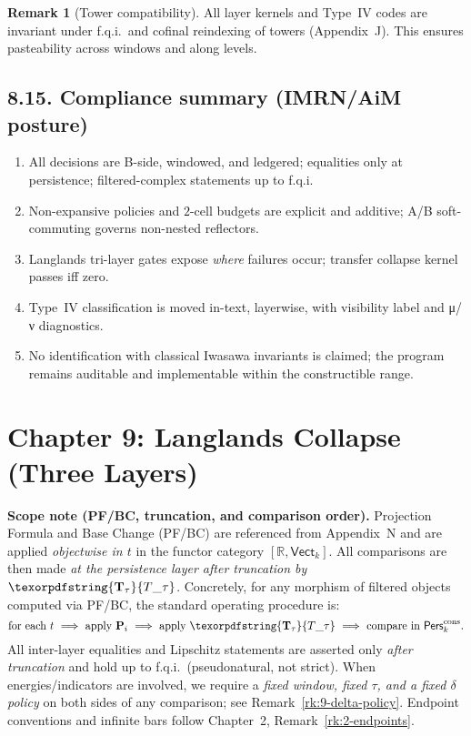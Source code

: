 \documentclass[11pt]{article}
\numberwithin{equation}{section}
\theoremstyle{plain}
\theoremstyle{definition}
\theoremstyle{remark}
\DeclareRobustCommand{\hyp}{\nobreakdash-}
\newcommand{\Pers}{\mathsf{Pers}}
\theoremstyle{plain}
\theoremstyle{definition}
\numberwithin{equation}{section}
\theoremstyle{definition}
\newtheorem{remark}[theorem]{Remark}
\DeclareRobustCommand{\Perskft}{\Pers^{\mathrm{cons}}_{k}}
\DeclareRobustCommand{\Ttau}{\texorpdfstring{\ensuremath{\mathbf{T}_{\tau}}}{T\_\tau}}
\numberwithin{equation}{section}
\theoremstyle{plain}
\theoremstyle{definition}
\theoremstyle{remark}
\providecommand{\Tfun}[1]{\mathbf{T}_{#1}}
\providecommand{\Ttau}{\Tfun{\tau}}
\begin{document}
\begin{remark}[Tower compatibility]
All layer kernels and Type~IV codes are invariant under f.q.i.\ and cofinal reindexing of towers (Appendix~J). This ensures pasteability across windows and along levels.
\end{remark}

\subsection*{8.15. Compliance summary (IMRN/AiM posture)}
\begin{enumerate}
  \item All decisions are B\hyp side, windowed, and ledgered; equalities only at persistence; filtered\hyp complex statements up to f.q.i.
  \item Non\hyp expansive policies and $2$\hyp cell budgets are explicit and additive; A/B soft\hyp commuting governs non\hyp nested reflectors.
  \item Langlands tri\hyp layer gates expose \emph{where} failures occur; transfer collapse kernel passes iff zero.
  \item Type~IV classification is moved in\hyp text, layerwise, with visibility label and μ/ν diagnostics.
  \item No identification with classical Iwasawa invariants is claimed; the program remains auditable and implementable within the constructible range.
\end{enumerate}



\section{Chapter 9: Langlands Collapse (Three Layers)}

\noindent\textbf{Scope note (PF/BC, truncation, and comparison order).}
Projection Formula and Base Change (PF/BC) are referenced from Appendix~N and are applied \emph{objectwise in \(t\)} in the functor category \([\mathbb{R},\mathsf{Vect}_k]\).
All comparisons are then made \emph{at the persistence layer after truncation by \(\Ttau\)}.
Concretely, for any morphism of filtered objects computed via PF/BC, the standard operating procedure is:
\[
\text{for each } t \ \Longrightarrow\ \text{apply } \mathbf{P}_i \ \Longrightarrow\ \text{apply } \Ttau \ \Longrightarrow\ \text{compare in } \Perskft.
\]
All inter\hyp layer equalities and Lipschitz statements are asserted only \emph{after truncation} and hold up to f.q.i.\ (pseudonatural, not strict).
When energies/indicators are involved, we require a \emph{fixed window, fixed \(\tau\), and a fixed \(\delta\)\nobreakdash policy} on both sides of any comparison; see Remark~\ref{rk:9-delta-policy}.
Endpoint conventions and infinite bars follow Chapter~2, Remark~\ref{rk:2-endpoints}.
\end{document}
